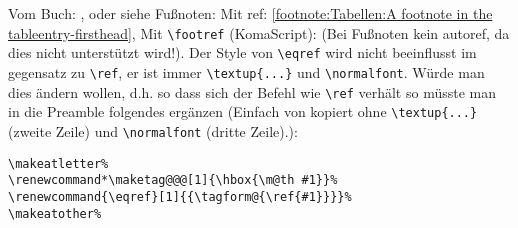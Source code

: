 Vom Buch: \cite{LabenbacherTeX}, oder siehe Fußnoten: Mit ref: \ref{footnote:Tabellen:A footnote in the tableentry-firsthead}, Mit \verb|\footref| (KomaScript):  (Bei Fußnoten kein autoref, da dies nicht unterstützt wird!). Der Style von \verb|\eqref| wird nicht beeinflusst im gegensatz zu \verb|\ref|, er ist immer \verb|\textup{...}| und \verb|\normalfont|. Würde man dies ändern wollen, d.h. so dass sich der Befehl wie \verb|\ref| verhält so müsste man in die Preamble folgendes ergänzen (Einfach von  kopiert ohne \verb|\textup{...}| (zweite Zeile) und \verb|\normalfont| (dritte Zeile).):%
\begin{lstlisting}[style=LaTeX, caption={\LaTeX-Code für \ldots{}.}, label={lst:introduction:3}]
\makeatletter%
\renewcommand*\maketag@@@[1]{\hbox{\m@th #1}}%
\renewcommand{\eqref}[1]{{\tagform@{\ref{#1}}}}%
\makeatother%
\end{lstlisting}


